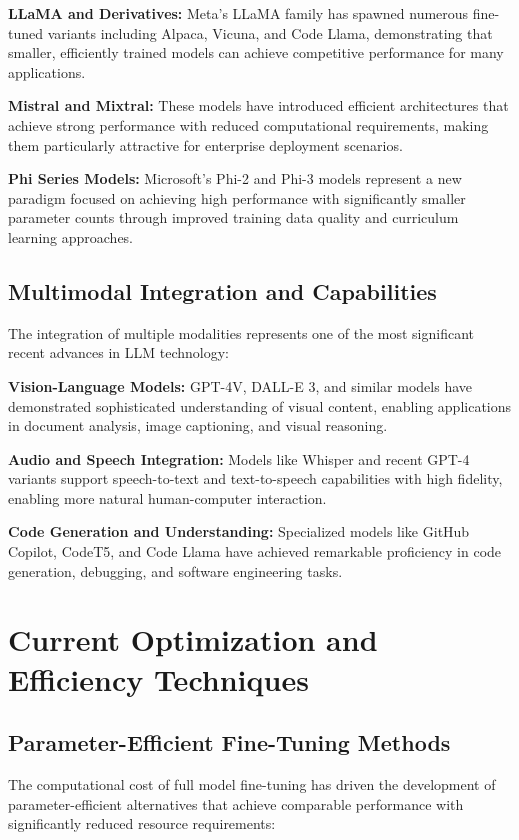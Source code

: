 \textbf{LLaMA and Derivatives:} Meta's LLaMA family has spawned numerous fine-tuned variants including Alpaca, Vicuna, and Code Llama, demonstrating that smaller, efficiently trained models can achieve competitive performance for many applications.

\textbf{Mistral and Mixtral:} These models have introduced efficient architectures that achieve strong performance with reduced computational requirements, making them particularly attractive for enterprise deployment scenarios.

\textbf{Phi Series Models:} Microsoft's Phi-2 and Phi-3 models \cite{PhiModel} represent a new paradigm focused on achieving high performance with significantly smaller parameter counts through improved training data quality and curriculum learning approaches.

\subsection{Multimodal Integration and Capabilities}

The integration of multiple modalities represents one of the most significant recent advances in LLM technology:

\textbf{Vision-Language Models:} GPT-4V, DALL-E 3, and similar models have demonstrated sophisticated understanding of visual content, enabling applications in document analysis, image captioning, and visual reasoning.

\textbf{Audio and Speech Integration:} Models like Whisper and recent GPT-4 variants support speech-to-text and text-to-speech capabilities with high fidelity, enabling more natural human-computer interaction.

\textbf{Code Generation and Understanding:} Specialized models like GitHub Copilot, CodeT5, and Code Llama have achieved remarkable proficiency in code generation, debugging, and software engineering tasks.

\section{Current Optimization and Efficiency Techniques}

\subsection{Parameter-Efficient Fine-Tuning Methods}

The computational cost of full model fine-tuning has driven the development of parameter-efficient alternatives that achieve comparable performance with significantly reduced resource requirements:

